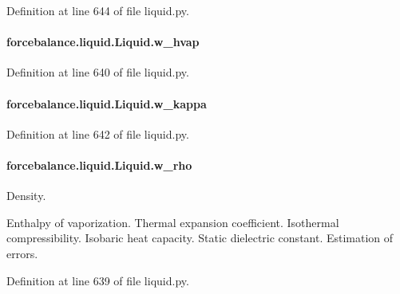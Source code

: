 Definition at line 644 of file liquid.\-py.

\hypertarget{classforcebalance_1_1liquid_1_1Liquid_abe985fe3aaa03d9f3a1b0a90f26b774d}{
\paragraph[{w\-\_\-hvap}]{\setlength{\rightskip}{0pt plus 5cm}forcebalance.\-liquid.\-Liquid.\-w\-\_\-hvap}}\label{classforcebalance_1_1liquid_1_1Liquid_abe985fe3aaa03d9f3a1b0a90f26b774d}


Definition at line 640 of file liquid.\-py.

\hypertarget{classforcebalance_1_1liquid_1_1Liquid_a6b262d9343247a902063bf62d5f19108}{
\paragraph[{w\-\_\-kappa}]{\setlength{\rightskip}{0pt plus 5cm}forcebalance.\-liquid.\-Liquid.\-w\-\_\-kappa}}\label{classforcebalance_1_1liquid_1_1Liquid_a6b262d9343247a902063bf62d5f19108}


Definition at line 642 of file liquid.\-py.

\hypertarget{classforcebalance_1_1liquid_1_1Liquid_aef8ad1dda086bde6f48130d273af9784}{
\paragraph[{w\-\_\-rho}]{\setlength{\rightskip}{0pt plus 5cm}forcebalance.\-liquid.\-Liquid.\-w\-\_\-rho}}\label{classforcebalance_1_1liquid_1_1Liquid_aef8ad1dda086bde6f48130d273af9784}


Density. 

Enthalpy of vaporization. Thermal expansion coefficient. Isothermal compressibility. Isobaric heat capacity. Static dielectric constant. Estimation of errors. 

Definition at line 639 of file liquid.\-py.

